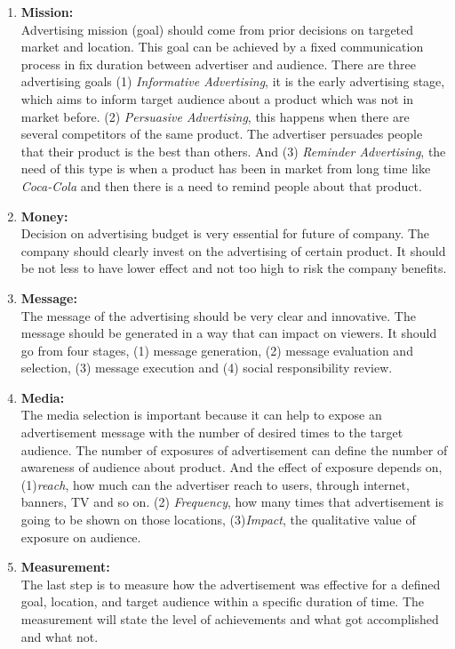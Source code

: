 \begin{enumerate}

\item \textbf{Mission:} \\
Advertising mission (goal) should come from prior decisions on targeted market and location. This goal can be achieved by a fixed communication process in fix duration between advertiser and audience. There are three advertising goals (1) \emph{Informative Advertising}, it is the early advertising stage, which aims to inform target audience about a product which was not in market before. (2) \emph{Persuasive Advertising}, this happens when there are several competitors of the same product. The advertiser persuades people that their product is the best than others. And (3) \emph{Reminder Advertising}, the need of this type is when a product has been in market from long time like \emph{Coca-Cola} and then there is a need to remind people about that product.

\item \textbf{Money:} \\
Decision on advertising budget is very essential for future of company. The company should clearly invest on the advertising of certain product. It should be not less to have lower effect and not too high to risk the company benefits. 

\item \textbf{Message:} \\
The message of the advertising should be very clear and innovative. The message should be generated in a way that can impact on viewers. It should go from four stages, (1) message generation, (2) message evaluation and selection, (3) message execution and (4) social responsibility review.

\item \textbf{Media:} \\
The media selection is important because it can help to expose an advertisement message with the number of desired times to the target audience. The number of exposures of advertisement can define the number of awareness of audience about product. And the effect of exposure depends on, (1)\emph{reach}, how much can the advertiser reach to users, through internet, banners, TV and so on. (2) \emph{Frequency}, how many times that advertisement is going to be shown on those locations, (3)\emph{Impact}, the qualitative value of exposure on audience.

\item \textbf{Measurement:} \\
The last step is to measure how the advertisement was effective for a defined goal, location, and target audience within a specific duration of time. The measurement will state the level of achievements and what got accomplished and what not.
\end{enumerate}



